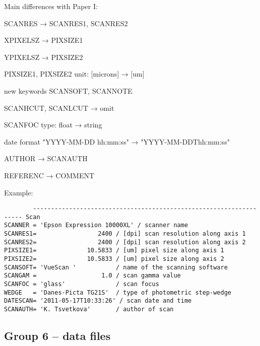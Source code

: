 \documentclass[11pt]{ivoa}
\begin{document}
Main differences with Paper I:

SCANRES → SCANRES1, SCANRES2

XPIXELSZ → PIXSIZE1

YPIXELSZ → PIXSIZE2

PIXSIZE1, PIXSIZE2 unit: [microns] → [um]

new keywords SCANSOFT, SCANNOTE

SCANHCUT, SCANLCUT → omit

SCANFOC type: float → string

date format "YYYY-MM-DD hh:mm:ss" → "YYYY-MM-DDThh:mm:ss"

AUTHOR → SCANAUTH

REFERENC → COMMENT

Example:

\begin{lstlisting}
        ------------------------------------------------------------------- Scan
SCANNER = 'Epson Expression 10000XL' / scanner name
SCANRES1=                 2400 / [dpi] scan resolution along axis 1
SCANRES2=                 2400 / [dpi] scan resolution along axis 2
PIXSIZE1=              10.5833 / [um] pixel size along axis 1
PIXSIZE2=              10.5833 / [um] pixel size along axis 2
SCANSOFT= 'VueScan '           / name of the scanning software
SCANGAM =                  1.0 / scan gamma value
SCANFOC = 'glass'              / scan focus
WEDGE   = 'Danes-Picta TG21S'  / type of photometric step-wedge
DATESCAN= '2011-05-17T10:33:26' / scan date and time
SCANAUTH= 'K. Tsvetkova'       / author of scan
\end{lstlisting}


\subsection{Group 6 – data files}
\end{document}

